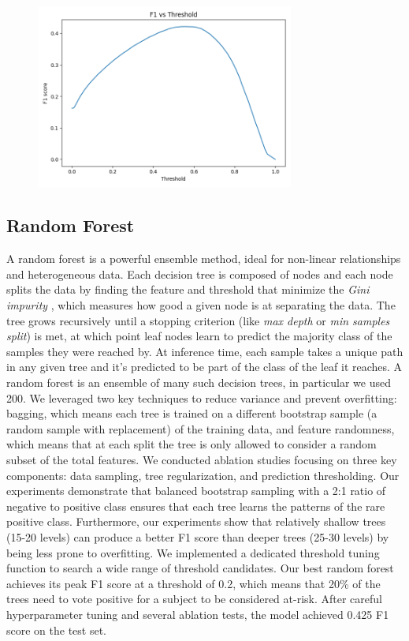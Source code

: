 \documentclass[10pt,conference,compsocconf]{IEEEtran}
\begin{document}
\begin{figure}[t!]
    \centering
    \includegraphics[width=85mm]{f1_vs_threshold.png}
    \label{f1}
\end{figure}

\subsection{Random Forest}
A random forest \cite{rf} is a powerful ensemble method, ideal for non-linear relationships and heterogeneous data. Each decision tree is composed of nodes and each node splits the data by finding the feature and threshold that minimize the \textit{Gini impurity} \cite{gini}, which measures how good a given node is at separating the data. The tree grows recursively until a stopping criterion (like \textit{max depth} or \textit{min samples split}) is met, at which point leaf nodes learn to predict the majority class of the samples they were reached by. At inference time, each sample takes a unique path in any given tree and it's predicted to be part of the class of the leaf it reaches. A random forest is an ensemble of many such decision trees, in particular we used 200. We leveraged two key techniques to reduce variance and prevent overfitting: bagging, which means each tree is trained on a different bootstrap sample (a random sample with replacement) of the training data, and feature randomness, which means that at each split the tree is only allowed to consider a random subset of the total features. We conducted ablation studies focusing on three key components: data sampling, tree regularization, and prediction thresholding. Our experiments demonstrate that balanced bootstrap sampling with a 2:1 ratio of negative to positive class ensures that each tree learns the patterns of the rare positive class. Furthermore, our experiments show that relatively shallow trees (15-20 levels) can produce a better F1 score than deeper trees (25-30 levels) by being less prone to overfitting. We implemented a dedicated threshold tuning function to search a wide range of threshold candidates. Our best random forest achieves its peak F1 score at a threshold of 0.2, which means that 20\% of the trees need to vote positive for a subject to be considered at-risk. After careful hyperparameter tuning and several ablation tests, the model achieved 0.425 F1 score on the test set.
\end{document}
